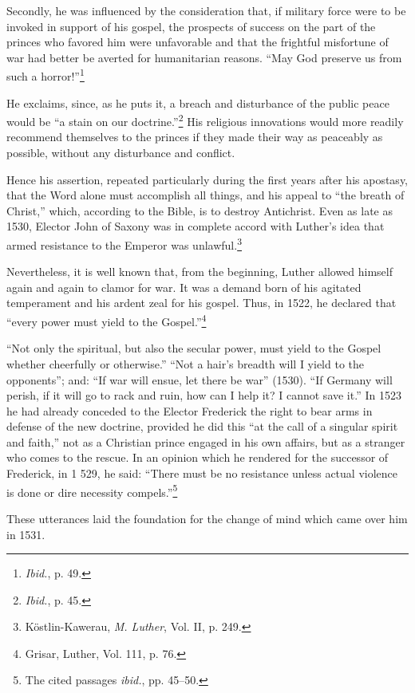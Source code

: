 Secondly, he was influenced by the consideration that, if military
force were to be invoked in support of his gospel, the prospects of
success on the part of the princes who favored him were unfavorable
and that the frightful misfortune of war had better be averted for
humanitarian reasons. “May God preserve us from such a horror!”\footnote{\textit{Ibid.}, p. 49.}

He exclaims, since, as he puts it, a breach and disturbance of the
public peace would be “a stain on our doctrine.”\footnote{\textit{Ibid.}, p. 45.}
His religious
innovations would more readily recommend themselves to the princes
if they made their way as peaceably as possible, without any disturbance
and conflict.

Hence his assertion, repeated particularly during the first years
after his apostasy, that the Word alone must accomplish all
things, and his appeal to “the breath of Christ,” which, according to
the Bible, is to destroy Antichrist. Even as late as 1530, Elector John
of Saxony was in complete accord with Luther’s idea that armed resistance
to the Emperor was unlawful.\footnote{Köstlin-Kawerau, \textit{M. Luther}, Vol. II, p. 249.}


Nevertheless, it is well known that, from the beginning, Luther
allowed himself again and again to clamor for war. It was a demand
born of his agitated temperament and his ardent zeal for his gospel.
Thus, in 1522, he declared that “every power must yield to the Gospel.”\footnote{Grisar, Luther, Vol. 111, p. 76.}

“Not only the spiritual, but also the secular power, must yield
to the Gospel whether cheerfully or otherwise.” “Not a hair’s breadth
will I yield to the opponents”; and: “If war will ensue, let there be
war” (1530). “If Germany will perish, if it will go to rack and
ruin, how can I help it? I cannot save it.” In 1523 he had already
conceded to the Elector Frederick the right to bear arms in defense
of the new doctrine, provided he did this “at the call of a singular
spirit and faith,” not as a Christian prince engaged in his own affairs,
but as a stranger who comes to the rescue. In an opinion which he rendered
for the successor of Frederick, in 1 529, he said: “There must be
no resistance unless actual violence is done or dire necessity compels.”\footnote{The cited passages \textit{ibid.}, pp. 45--50.}


These utterances laid the foundation for the change of mind which
came over him in 1531.

